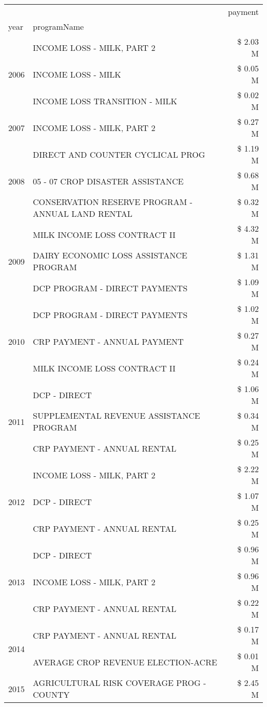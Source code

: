 \begin{tabular}{llr}
\toprule
 &  & payment \\
year & programName &  \\
\midrule
\multirow[t]{3}{*}{2006} & INCOME LOSS - MILK, PART 2 & \$ 2.03 M \\
 & INCOME LOSS - MILK & \$ 0.05 M \\
 & INCOME LOSS TRANSITION - MILK & \$ 0.02 M \\
\cline{1-3}
2007 & INCOME LOSS - MILK, PART 2 & \$ 0.27 M \\
\cline{1-3}
\multirow[t]{3}{*}{2008} & DIRECT AND COUNTER CYCLICAL PROG & \$ 1.19 M \\
 & 05 - 07 CROP DISASTER ASSISTANCE & \$ 0.68 M \\
 & CONSERVATION RESERVE PROGRAM - ANNUAL LAND RENTAL & \$ 0.32 M \\
\cline{1-3}
\multirow[t]{3}{*}{2009} & MILK INCOME LOSS CONTRACT II & \$ 4.32 M \\
 & DAIRY ECONOMIC LOSS ASSISTANCE PROGRAM & \$ 1.31 M \\
 & DCP PROGRAM - DIRECT PAYMENTS & \$ 1.09 M \\
\cline{1-3}
\multirow[t]{3}{*}{2010} & DCP PROGRAM - DIRECT PAYMENTS & \$ 1.02 M \\
 & CRP PAYMENT - ANNUAL PAYMENT & \$ 0.27 M \\
 & MILK INCOME LOSS CONTRACT II & \$ 0.24 M \\
\cline{1-3}
\multirow[t]{3}{*}{2011} & DCP - DIRECT & \$ 1.06 M \\
 & SUPPLEMENTAL REVENUE ASSISTANCE PROGRAM & \$ 0.34 M \\
 & CRP PAYMENT - ANNUAL RENTAL & \$ 0.25 M \\
\cline{1-3}
\multirow[t]{3}{*}{2012} & INCOME LOSS - MILK, PART 2 & \$ 2.22 M \\
 & DCP - DIRECT & \$ 1.07 M \\
 & CRP PAYMENT - ANNUAL RENTAL & \$ 0.25 M \\
\cline{1-3}
\multirow[t]{3}{*}{2013} & DCP - DIRECT & \$ 0.96 M \\
 & INCOME LOSS - MILK, PART 2 & \$ 0.96 M \\
 & CRP PAYMENT - ANNUAL RENTAL & \$ 0.22 M \\
\cline{1-3}
\multirow[t]{2}{*}{2014} & CRP PAYMENT - ANNUAL RENTAL & \$ 0.17 M \\
 & AVERAGE CROP REVENUE ELECTION-ACRE & \$ 0.01 M \\
\cline{1-3}
\multirow[t]{3}{*}{2015} & AGRICULTURAL RISK COVERAGE PROG - COUNTY & \$ 2.45 M \\

\end{tabular}
